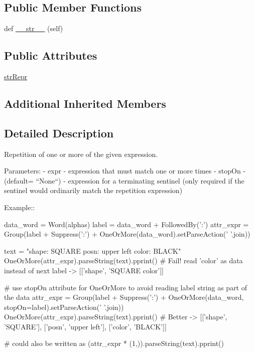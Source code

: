 \subsection*{Public Member Functions}
\begin{DoxyCompactItemize}
\item 
def \hyperlink{classpyparsing_1_1OneOrMore_a1204e3f0c12b4db20448c894c103c76b}{\+\_\+\+\_\+str\+\_\+\+\_\+} (self)
\end{DoxyCompactItemize}
\subsection*{Public Attributes}
\begin{DoxyCompactItemize}
\item 
\hyperlink{classpyparsing_1_1OneOrMore_a94798b104eabfe12f3f275146001264f}{str\+Repr}
\end{DoxyCompactItemize}
\subsection*{Additional Inherited Members}


\subsection{Detailed Description}
\begin{DoxyVerb}Repetition of one or more of the given expression.

Parameters:
 - expr - expression that must match one or more times
 - stopOn - (default= ``None``) - expression for a terminating sentinel
      (only required if the sentinel would ordinarily match the repetition
      expression)

Example::

    data_word = Word(alphas)
    label = data_word + FollowedBy(':')
    attr_expr = Group(label + Suppress(':') + OneOrMore(data_word).setParseAction(' '.join))

    text = "shape: SQUARE posn: upper left color: BLACK"
    OneOrMore(attr_expr).parseString(text).pprint()  # Fail! read 'color' as data instead of next label -> [['shape', 'SQUARE color']]

    # use stopOn attribute for OneOrMore to avoid reading label string as part of the data
    attr_expr = Group(label + Suppress(':') + OneOrMore(data_word, stopOn=label).setParseAction(' '.join))
    OneOrMore(attr_expr).parseString(text).pprint() # Better -> [['shape', 'SQUARE'], ['posn', 'upper left'], ['color', 'BLACK']]

    # could also be written as
    (attr_expr * (1,)).parseString(text).pprint()
\end{DoxyVerb}
 

